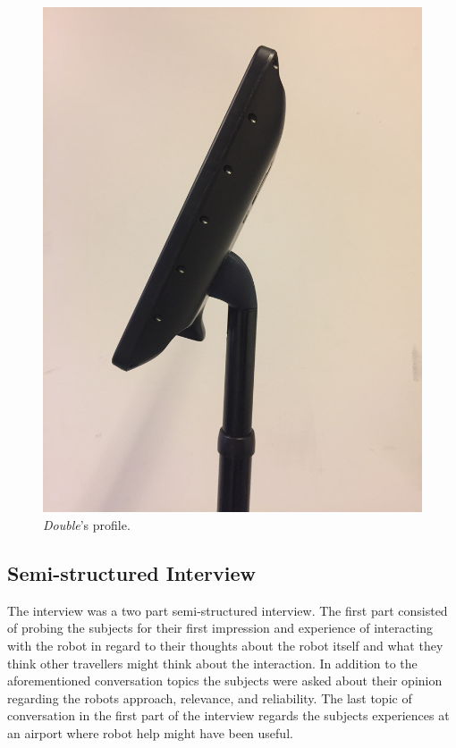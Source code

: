 \begin{figure}[H]
\begin{minipage}{.25\textwidth}
  \includegraphics[width=\linewidth, angle =-90]{Figure/ModificeretDoubleSideClose}
  \caption{\textit{Double}'s profile.}
  \label{fig:ModificeretDoubleSideClose}
\end{minipage}
\end{figure}
\noindent
%

\subsection{Semi-structured Interview}
The interview was a two part semi-structured interview. The first part consisted of probing the subjects for their first impression and experience of interacting with the robot in regard to their thoughts about the robot itself and what they think other travellers might think about the interaction. In addition to the aforementioned conversation topics the subjects were asked about their opinion regarding the robots approach, relevance, and reliability. The last topic of conversation in the first part of the interview regards the subjects experiences at an airport where robot help might have been useful.

